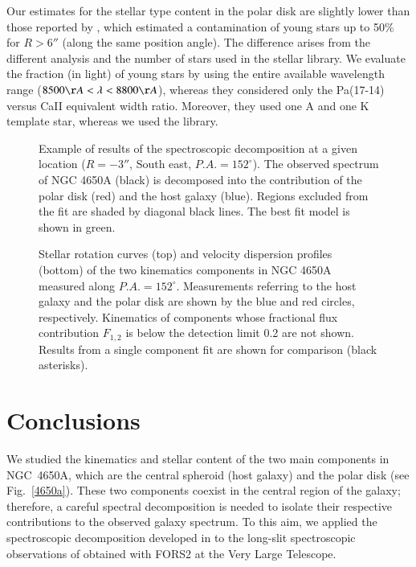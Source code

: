 \documentclass{aa}
\begin{document}
Our estimates for the stellar type content in the polar disk are
slightly lower than those reported by \citet{Iodice+06}, which
estimated a contamination of young stars up to 50\% for $R>6''$ (along
the same position angle). The difference arises from the different
analysis and the number of stars used in the stellar library.  We
evaluate the fraction (in light) of young stars by using the entire
available wavelength range ($8500\AA < \lambda < 8800\AA$), whereas
they considered only the Pa(17-14) versus Ca{\small II} equivalent
width ratio. Moreover, they used one A and one K template star,
whereas we used the \citet{Cenarro+01} library.

\begin{figure}
\centering
\caption{Example of results of the spectroscopic decomposition at a
  given location ($R=-3''$, South east, $P.A.=152^{\circ}$). The observed
  spectrum of NGC 4650A (black) is decomposed into the contribution of
  the polar disk (red) and the host galaxy (blue). Regions excluded
  from the fit are shaded by diagonal black lines. The best fit model is shown in
  green.}
\label{fig:result_fit}
\end{figure}

\begin{figure}
\centering
\caption{Stellar rotation curves (top) and velocity dispersion
  profiles (bottom) of the two kinematics components in NGC 4650A
  measured along $P.A.=152^{\circ}$. Measurements referring to the
  host galaxy and the polar disk are shown by the blue and red
  circles, respectively. Kinematics of components whose fractional
  flux contribution $F_{1,2}$ is below the detection limit 0.2 are not
  shown. Results from a single component fit \citep{Iodice+06} are
  shown for comparison (black asterisks).}
\label{fig:result_rot_curve}
\end{figure}




\section{Conclusions}\label{concl}

We studied the kinematics and stellar content of the two main
components in NGC~4650A, which are the central spheroid (host galaxy)
and the polar disk (see Fig.~\ref{4650a}). These two components
coexist in the central region of the galaxy; therefore, a careful
spectral decomposition is needed to isolate their respective
contributions to the observed galaxy spectrum. To this aim, we applied
the spectroscopic decomposition developed in \citet{Coccato+11} to the
long-slit spectroscopic observations of \citet{Iodice+06} obtained
with FORS2 at the Very Large Telescope.
\end{document}
